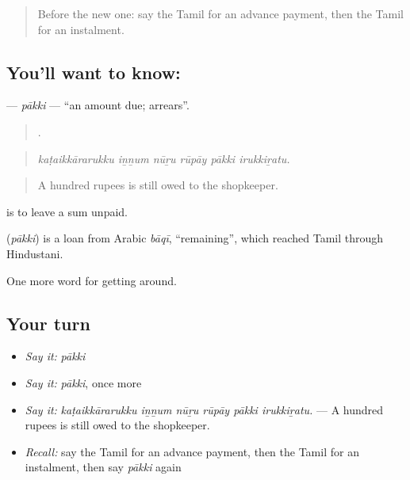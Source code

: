 \label{lesson:TA-C447-pakki}



\begin{quote}
Before the new one: say the Tamil for an advance payment, then the Tamil for an instalment.
\end{quote}

\subsection*{You'll want to know: }
\textbf{} — \emph{pākki} — \textquotedblleft{}an amount due; arrears\textquotedblright{}.

\begin{quote}
     .
\end{quote}

\begin{quote}
\emph{kaṭaikkārarukku iṉṉum nūṟu rūpāy pākki irukkiṟatu.}
\end{quote}

\begin{quote}
A hundred rupees is still owed to the shopkeeper.
\end{quote}

  is to leave a sum unpaid.

\begin{cousinweb}
\textbf{} (\emph{pākki}) is a loan from Arabic \emph{bāqī}, \textquotedblleft{}remaining\textquotedblright{}, which reached Tamil through Hindustani.
\end{cousinweb}

\begin{grammarlens}[title={What you've built}]
One more word for getting around.
\end{grammarlens}

\subsection*{Your turn}
\begin{itemize}
\raggedright
  \item \emph{Say it:} \emph{pākki}
  \item \emph{Say it:} \emph{pākki}, once more
  \item \emph{Say it:} \emph{kaṭaikkārarukku iṉṉum nūṟu rūpāy pākki irukkiṟatu.} — A hundred rupees is still owed to the shopkeeper.
  \item \emph{Recall:} say the Tamil for an advance payment, then the Tamil for an instalment, then say \emph{pākki} again
\end{itemize}

